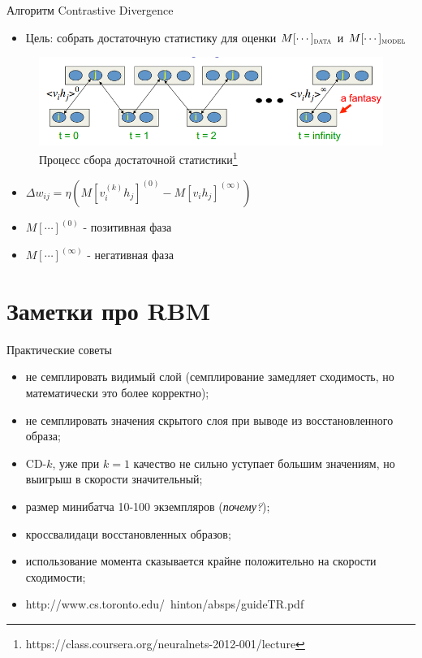 \documentclass[10pt]{beamer}
\begin{document}
\begin{frame}{Алгоритм Contrastive Divergence}

\begin{itemize}
	\item Цель: собрать достаточную статистику для оценки $M[\cdots]_{\textsc{data}}$ и $M[\cdots]_{\textsc{model}}$
\end{itemize}

\begin{figure}[h!]
  \centering
  \includegraphics[width=1\textwidth]{images/cd.png}
  \caption{Процесс сбора достаточной статистики\footnote{https://class.coursera.org/neuralnets-2012-001/lecture}}
\end{figure}

\begin{itemize}
	\item $\Delta w_{ij} = \eta \left( M\left[v_i^{(k)} h_j \right]^{(0)} - M\left[v_i h_j\right]^{(\infty)} \right)$
	\item $M\left[\cdots \right]^{(0)}$ - позитивная фаза
	\item $M\left[\cdots\right]^{(\infty)}$ - негативная фаза
\end{itemize}

\end{frame}


\section{Заметки про RBM}

\begin{frame}{Практические советы}

\begin{itemize}
	\item не семплировать видимый слой (семплирование замедляет сходимость, но математически это более корректно);
	\item не семплировать значения скрытого слоя при выводе из восстановленного образа;
	\item CD-$k$, уже при $k=1$ качество не сильно уступает большим значениям, но выигрыш в скорости значительный;
	\item размер минибатча 10-100 экземпляров (\textit{почему?});
	\item кроссвалидаци восстановленных образов;
	\item использование момента сказывается крайне положительно на скорости сходимости;
	\item http://www.cs.toronto.edu/~hinton/absps/guideTR.pdf
\end{itemize}

\end{frame}
\end{document}
